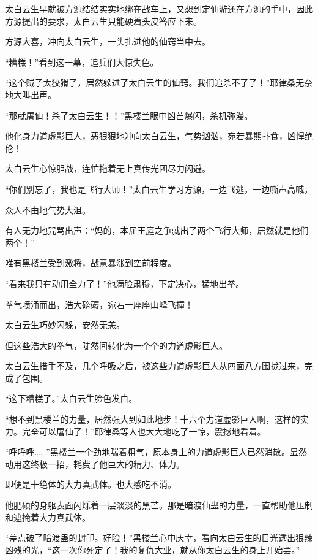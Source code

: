 
\begin{this_body}

太白云生早就被方源结结实实地绑在战车上，又想到定仙游还在方源的手中，因此方源提出的要求，太白云生只能硬着头皮答应下来。

方源大喜，冲向太白云生，一头扎进他的仙窍当中去。

“糟糕！”看到这一幕，追兵们大惊失色。

“这个贼子太狡猾了，居然躲进了太白云生的仙窍。我们追杀不了了！”耶律桑无奈地大叫出声。

“那就屠仙！杀了太白云生！！”黑楼兰眼中凶芒爆闪，杀机弥漫。

他化身力道虚影巨人，恶狠狠地冲向太白云生，气势汹汹，宛若暴熊扑食，凶悍绝伦！

太白云生心惊胆战，连忙拖着无上真传光团尽力闪避。

“你们别忘了，我也是飞行大师！”太白云生学习方源，一边飞逃，一边嘶声高喊。

众人不由地气势大沮。

有人无力地咒骂出声：“妈的，本届王庭之争就出了两个飞行大师，居然就是他们两个！”

唯有黑楼兰受到激将，战意暴涨到空前程度。

“看来我只有动用全力了！”他满脸肃穆，下定决心，猛地出拳。

拳气喷涌而出，浩大磅礴，宛若一座座山峰飞撞！

太白云生巧妙闪躲，安然无恙。

但这些浩大的拳气，陡然间转化为一个个的力道虚影巨人。

太白云生措手不及，几个呼吸之后，被这些力道虚影巨人从四面八方围拢过来，完成了包围。

“这下糟糕了。”太白云生脸色发白。

“想不到黑楼兰的力量，居然强大到如此地步！十六个力道虚影巨人啊，这样的实力。完全可以屠仙了！”耶律桑等人也大大地吃了一惊，震撼地看着。

“呼呼呼……”黑楼兰一个劲地喘着粗气，原本身上的力道虚影巨人已然消散。显然动用这终极一招，耗费了他巨大的精力、体力。

即便是十绝体的大力真武体。也大感吃不消。

他肥硕的身躯表面闪烁着一层淡淡的黑芒。那是暗渡仙蛊的力量，一直帮助他压制和遮掩着大力真武体。

“差点破了暗渡蛊的封印。好险！”黑楼兰心中庆幸，看向太白云生的目光透出狠辣凶残的光，“这一次你死定了！我的复仇大业，就从你太白云生的身上开始罢。”


\end{this_body}
